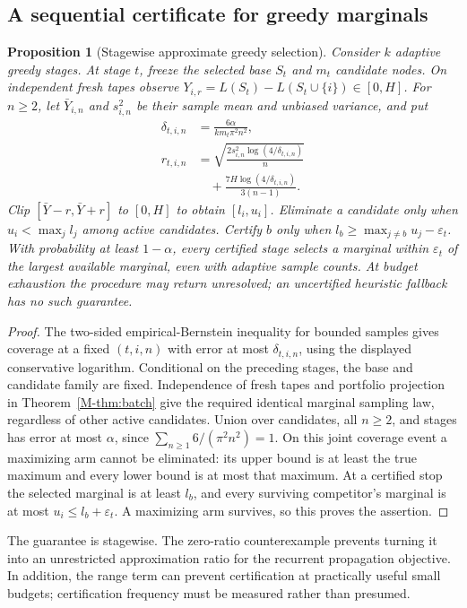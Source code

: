 \documentclass[preprint,11pt,sort&compress]{elsarticle}
\newtheorem{proposition}[theorem]{Proposition}
\begin{document}
\subsection{A sequential certificate for greedy marginals}
\begin{proposition}[Stagewise approximate greedy selection]
\label{prop:race}
Consider $k$ adaptive greedy stages. At stage $t$, freeze the selected base $S_t$ and $m_t$ candidate nodes. On independent fresh tapes observe $Y_{i,r}=L(S_t)-L(S_t\cup\{i\})\in[0,H]$. For $n\ge2$, let $\bar Y_{i,n}$ and $s^2_{i,n}$ be their sample mean and unbiased variance, and put
\begin{align*}
 \delta_{t,i,n}&=\frac{6\alpha}{k m_t\pi^2n^2},\\
 r_{t,i,n}&=\sqrt{\frac{2s^2_{i,n}\log(4/\delta_{t,i,n})}{n}}\\
 &\quad+\frac{7H\log(4/\delta_{t,i,n})}{3(n-1)}.
\end{align*}
Clip $[\bar Y-r,\bar Y+r]$ to $[0,H]$ to obtain $[l_i,u_i]$. Eliminate a candidate only when $u_i<\max_j l_j$ among active candidates. Certify $b$ only when $l_b\ge\max_{j\ne b}u_j-\varepsilon_t$. With probability at least $1-\alpha$, every certified stage selects a marginal within $\varepsilon_t$ of the largest available marginal, even with adaptive sample counts. At budget exhaustion the procedure may return unresolved; an uncertified heuristic fallback has no such guarantee.
\end{proposition}
\begin{proof}
The two-sided empirical-Bernstein inequality for bounded samples gives coverage at a fixed $(t,i,n)$ with error at most $\delta_{t,i,n}$, using the displayed conservative logarithm. Conditional on the preceding stages, the base and candidate family are fixed. Independence of fresh tapes and portfolio projection in Theorem~\ref{M-thm:batch} give the required identical marginal sampling law, regardless of other active candidates. Union over candidates, all $n\ge2$, and stages has error at most $\alpha$, since $\sum_{n\ge1}6/(\pi^2n^2)=1$. On this joint coverage event a maximizing arm cannot be eliminated: its upper bound is at least the true maximum and every lower bound is at most that maximum. At a certified stop the selected marginal is at least $l_b$, and every surviving competitor's marginal is at most $u_i\le l_b+\varepsilon_t$. A maximizing arm survives, so this proves the assertion.
\end{proof}
The guarantee is stagewise. The zero-ratio counterexample prevents turning it into an unrestricted approximation ratio for the recurrent propagation objective. In addition, the range term can prevent certification at practically useful small budgets; certification frequency must be measured rather than presumed.
\end{document}

